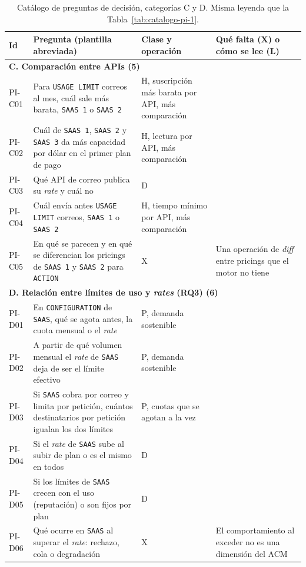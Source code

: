 \begin{table}[htbp]
\centering
\scriptsize
\begin{tabular}{|l|>{\raggedright\arraybackslash}p{6.6cm}|>{\raggedright\arraybackslash}p{2.2cm}|>{\raggedright\arraybackslash}p{3.4cm}|}
\hline
\textbf{Id} & \textbf{Pregunta (plantilla abreviada)} & \textbf{Clase y operación} & \textbf{Qué falta (X) o cómo se lee (L)} \\
\hline
\multicolumn{4}{|l|}{\textbf{C. Comparación entre APIs (5)}} \\
\hline
PI-C01 & Para \texttt{USAGE LIMIT} correos al mes, cuál sale más barata, \texttt{SAAS 1} o \texttt{SAAS 2} & H, suscripción más barata por API, más comparación & \\
PI-C02 & Cuál de \texttt{SAAS 1}, \texttt{SAAS 2} y \texttt{SAAS 3} da más capacidad por dólar en el primer plan de pago & H, lectura por API, más comparación & \\
PI-C03 & Qué API de correo publica su \textit{rate} y cuál no & D & \\
PI-C04 & Cuál envía antes \texttt{USAGE LIMIT} correos, \texttt{SAAS 1} o \texttt{SAAS 2} & H, tiempo mínimo por API, más comparación & \\
PI-C05 & En qué se parecen y en qué se diferencian los pricings de \texttt{SAAS 1} y \texttt{SAAS 2} para \texttt{ACTION} & X & Una operación de \textit{diff} entre pricings que el motor no tiene \\
\hline
\multicolumn{4}{|l|}{\textbf{D. Relación entre límites de uso y \textit{rates} (RQ3) (6)}} \\
\hline
PI-D01 & En \texttt{CONFIGURATION} de \texttt{SAAS}, qué se agota antes, la cuota mensual o el \textit{rate} & P, demanda sostenible & \\
PI-D02 & A partir de qué volumen mensual el \textit{rate} de \texttt{SAAS} deja de ser el límite efectivo & P, demanda sostenible & \\
PI-D03 & Si \texttt{SAAS} cobra por correo y limita por petición, cuántos destinatarios por petición igualan los dos límites & P, cuotas que se agotan a la vez & \\
PI-D04 & Si el \textit{rate} de \texttt{SAAS} sube al subir de plan o es el mismo en todos & D & \\
PI-D05 & Si los límites de \texttt{SAAS} crecen con el uso (reputación) o son fijos por plan & D & \\
PI-D06 & Qué ocurre en \texttt{SAAS} al superar el \textit{rate}: rechazo, cola o degradación & X & El comportamiento al exceder no es una dimensión del ACM \\
\hline
\end{tabular}
\caption[Catálogo de preguntas de decisión, categorías C y D]{Catálogo de preguntas de decisión, categorías C y D. Misma
leyenda que la Tabla~\ref{tab:catalogo-pi-1}.}
\label{tab:catalogo-pi-2}
\end{table}

